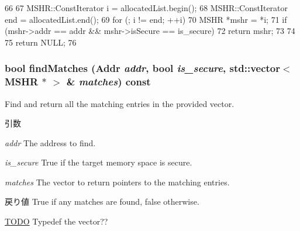 \begin{DoxyCode}
66 {
67     MSHR::ConstIterator i = allocatedList.begin();
68     MSHR::ConstIterator end = allocatedList.end();
69     for (; i != end; ++i) {
70         MSHR *mshr = *i;
71         if (mshr->addr == addr && mshr->isSecure == is_secure) {
72             return mshr;
73         }
74     }
75     return NULL;
76 }
\end{DoxyCode}
\hypertarget{classMSHRQueue_a020dd5bb628863baf3800f816cfba197}{
\subsubsection[{findMatches}]{\setlength{\rightskip}{0pt plus 5cm}bool findMatches ({\bf Addr} {\em addr}, \/  bool {\em is\_\-secure}, \/  {\bf std::vector}$<$ {\bf MSHR} $\ast$ $>$ \& {\em matches}) const}}
\label{classMSHRQueue_a020dd5bb628863baf3800f816cfba197}
Find and return all the matching entries in the provided vector. 
\begin{DoxyParams}{引数}
\item[{\em addr}]The address to find. \item[{\em is\_\-secure}]True if the target memory space is secure. \item[{\em matches}]The vector to return pointers to the matching entries. \end{DoxyParams}
\begin{DoxyReturn}{戻り値}
True if any matches are found, false otherwise. 
\end{DoxyReturn}
\begin{Desc}
\item[\hyperlink{todo__todo000078}{TODO}]Typedef the vector?? \end{Desc}



